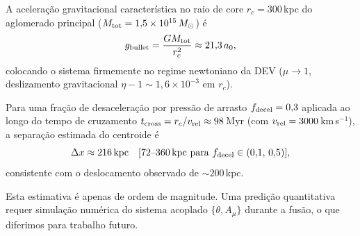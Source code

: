 \documentclass[aps,prd,twocolumn,showpacs,superscriptaddress]{revtex4-2}
\newcommand{\aO}{a_0}
\begin{document}
A aceleração gravitacional característica no raio de core
$r_c = 300$\,kpc do aglomerado principal
($M_{\rm tot} = 1{,}5\times10^{15}\,M_\odot$) é
\begin{equation}
  g_{\rm bullet} = \frac{GM_{\rm tot}}{r_c^2}
  \approx 21{,}3\,\aO,
\end{equation}
colocando o sistema firmemente no regime newtoniano da DEV
($\mu \to 1$, deslizamento gravitacional
$\eta -1 \sim 1{,}6\times10^{-3}$ em $r_c$).

Para uma fração de desaceleração por pressão de arrasto
$f_{\rm decel} = 0{,}3$ aplicada ao longo do tempo de
cruzamento $t_{\rm cross} = r_c/v_{\rm rel} \approx 98$\,Myr
(com $v_{\rm rel} = 3000$\,km\,s$^{-1}$), a separação estimada
do centroide é
\begin{equation}
  \Delta x \approx 216\,{\rm kpc}
  \quad [72\text{--}360\,{\rm kpc\ para\ }
  f_{\rm decel}\in(0{,}1,\,0{,}5)],
\end{equation}
consistente com o deslocamento observado de ${\sim}200$\,kpc.

Esta estimativa é apenas de ordem de magnitude.
Uma predição quantitativa requer simulação numérica do sistema
acoplado $\{\theta, A_\mu\}$ durante a fusão, o que diferimos
para trabalho futuro.



\end{document}

